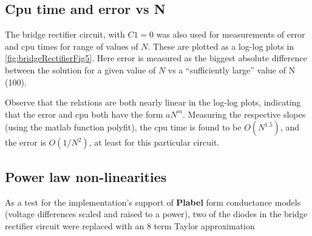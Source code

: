 \subsection{Cpu time and error vs N}

The bridge rectifier circuit, with \( C1 = 0 \) was also used for
measurements of error and cpu times for range of values of \( N \).
These are plotted as a log-log plots in
\cref{fig:bridgeRectifierFig5}.
Here error is measured as the biggest absolute difference between the solution for a given value of \( N \) vs
a ``sufficiently large'' value of N (100).


Observe that the relations are both nearly linear in the log-log plots, indicating that the error and cpu both have the form \( a N^m \).
Measuring the respective slopes (using the matlab function polyfit), the cpu time is found to be \( O(N^{1.5}) \), and the error is \( O(1/N^2) \), at least for this particular circuit.


\subsection{Power law non-linearities}

As a test for the implementation's support of \textbf{Plabel} form conductance models (voltage differences scaled and raised to a power),
two of the diodes in the bridge rectifier circuit were replaced with an 8 term Taylor approximation

